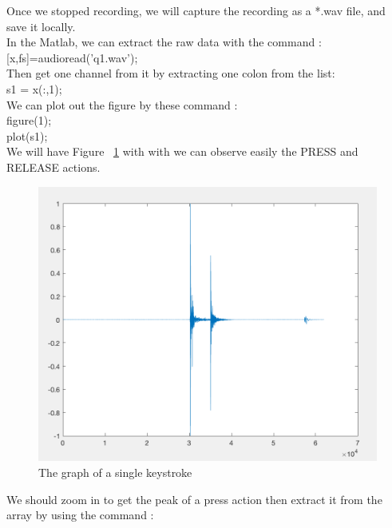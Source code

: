\documentclass[12pt,a4paper]{article}
\begin{document}
	Once we stopped recording, we will capture the recording as a *.wav file, and save it locally. \\
	
	In the Matlab, we can extract the raw data with the command :\\

	[x,fs]=audioread('q1.wav');\\
	
	Then get one channel from it by extracting one colon from the list: \\
	
	s1 = x(:,1); \\

	We can plot out the figure by these command :\\ 
	
	figure(1);\\
	
	plot(s1);\\

	We will have Figure ~\ref{fig:13} with with we can observe easily the PRESS and RELEASE actions. \\
\begin{figure}[h]
\begin{center}
        \includegraphics[scale=0.5]{fig13.png}
        \caption{The graph of a single keystroke}
        \label{fig:13}
\end{center}
\end{figure} \par
\FloatBarrier

We should zoom in to get the peak of a press action then extract it from the array by using the command : \\
\end{document}
